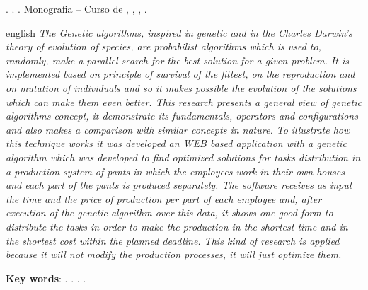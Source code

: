 
\begin{OnehalfSpacing} 

\noindent \imprimirAutorCitacaoMaiuscula. {\bfseries\imprimirtitulo}. {\imprimirdata}.  Monografia -- Curso de {\MakeUppercase\imprimircurso}, {\imprimirinstituicao}, {\imprimirlocal}, {\imprimirdata}.

\vspace{\onelineskip}
\vspace{\onelineskip}
\vspace{\onelineskip}
\vspace{\onelineskip}

\begin{resumo}[Abstract]%
\begin{otherlanguage*}{english}%
\textit{
\noindent The Genetic algorithms, inspired in genetic and in the Charles Darwin's theory
of evolution of species, are probabilist algorithms which is used to, randomly, 
make a parallel search for the best solution for a given problem. It is 
implemented based on principle of survival of the fittest, on the reproduction 
and on mutation of individuals and so it makes possible the evolution of the 
solutions which can make them even better. This research presents a general 
view of genetic algorithms concept, it demonstrate its fundamentals, operators 
and configurations and also makes a comparison with similar concepts in 
nature. To illustrate how this technique works it was developed an WEB based 
application with a genetic algorithm which was developed to find optimized 
solutions for tasks distribution in a production system of pants in which the 
employees work in their own houses and each part of the pants is produced 
separately. The software receives as input the time and the price of production 
per part of each employee and, after execution of the genetic algorithm over this 
data, it shows one good form to distribute the tasks in order to make the 
production in the shortest time and in the shortest cost within the planned 
deadline. This kind of research is applied because it will not modify the 
production processes, it will just optimize them.
}

\vspace{\onelineskip}
\vspace*{\fill}
\noindent \textbf{Key words}: \imprimirKeyWordOne. \imprimirKeyWordTwo. \imprimirKeyWordThree. \imprimirKeyWordFour.
\end{otherlanguage*}
\vspace{\onelineskip}
\end{resumo}

\end{OnehalfSpacing}
